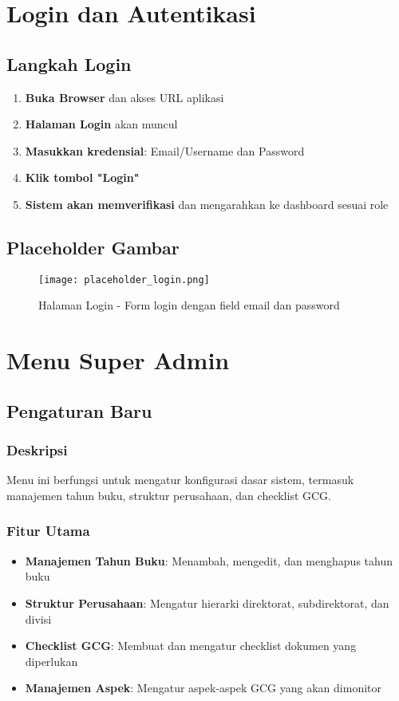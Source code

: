 \documentclass[12pt,a4paper]{article}
\begin{document}
\section{Login dan Autentikasi}
\subsection{Langkah Login}
\begin{enumerate}
\item \textbf{Buka Browser} dan akses URL aplikasi
\item \textbf{Halaman Login} akan muncul
\item \textbf{Masukkan kredensial}: Email/Username dan Password
\item \textbf{Klik tombol "Login"}
\item \textbf{Sistem akan memverifikasi} dan mengarahkan ke dashboard sesuai role
\end{enumerate}

\subsection{Placeholder Gambar}
\begin{figure}[H]
\centering
\texttt{[image: placeholder\_login.png]}
\caption{Halaman Login - Form login dengan field email dan password}
\label{fig:login}
\end{figure}

\section{Menu Super Admin}
\subsection{Pengaturan Baru}
\subsubsection{Deskripsi}
Menu ini berfungsi untuk mengatur konfigurasi dasar sistem, termasuk manajemen tahun buku, struktur perusahaan, dan checklist GCG.

\subsubsection{Fitur Utama}
\begin{itemize}
\item \textbf{Manajemen Tahun Buku}: Menambah, mengedit, dan menghapus tahun buku
\item \textbf{Struktur Perusahaan}: Mengatur hierarki direktorat, subdirektorat, dan divisi
\item \textbf{Checklist GCG}: Membuat dan mengatur checklist dokumen yang diperlukan
\item \textbf{Manajemen Aspek}: Mengatur aspek-aspek GCG yang akan dimonitor
\end{itemize}
\end{document}

